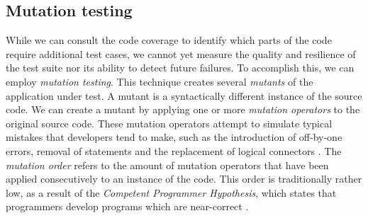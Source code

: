 \subsection{Mutation testing}\label{sssec:mutation-testing}
While we can consult the code coverage to identify which parts of the code require additional test cases, we cannot yet measure the quality and resilience of the test suite nor its ability to detect future failures. To accomplish this, we can employ \emph{mutation testing}. This technique creates several \emph{mutants} of the application under test. A mutant is a syntactically different instance of the source code. We can create a mutant by applying one or more \emph{mutation operators} to the original source code. These mutation operators attempt to simulate typical mistakes that developers tend to make, such as the introduction of off-by-one errors, removal of statements and the replacement of logical connectors \cite{Offutt2001}. The \emph{mutation order} refers to the amount of mutation operators that have been applied consecutively to an instance of the code. This order is traditionally rather low, as a result of the \emph{Competent Programmer Hypothesis}, which states that programmers develop programs which are near-correct \cite{5487526}.

